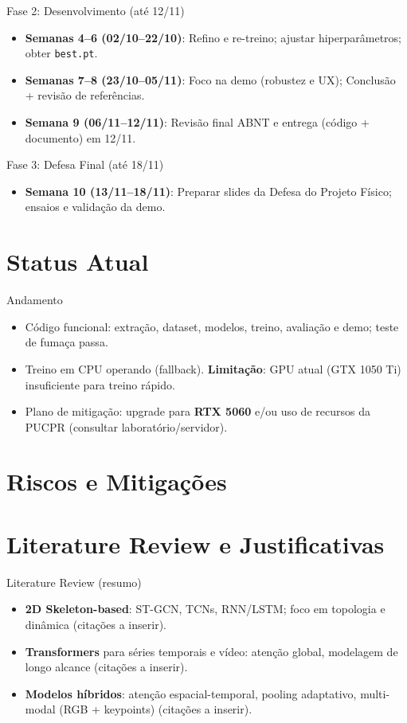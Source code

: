\documentclass[aspectratio=169]{beamer}
\begin{document}
\begin{frame}{Fase 2: Desenvolvimento (até 12/11)}
  \begin{itemize}
    \item \textbf{Semanas 4–6 (02/10–22/10)}: Refino e re-treino; ajustar hiperparâmetros; obter \texttt{best.pt}.
    \item \textbf{Semanas 7–8 (23/10–05/11)}: Foco na demo (robustez e UX); Conclusão + revisão de referências.
    \item \textbf{Semana 9 (06/11–12/11)}: Revisão final ABNT e entrega (código + documento) em 12/11.
  \end{itemize}
\end{frame}

\begin{frame}{Fase 3: Defesa Final (até 18/11)}
  \begin{itemize}
    \item \textbf{Semana 10 (13/11–18/11)}: Preparar slides da Defesa do Projeto Físico; ensaios e validação da demo.
  \end{itemize}
\end{frame}

\section{Status Atual}
\begin{frame}{Andamento}
  \begin{itemize}
    \item Código funcional: extração, dataset, modelos, treino, avaliação e demo; teste de fumaça passa.
    \item Treino em CPU operando (fallback). \textbf{Limitação}: GPU atual (GTX 1050 Ti) insuficiente para treino rápido.
    \item Plano de mitigação: upgrade para \textbf{RTX 5060} e/ou uso de recursos da PUCPR (consultar laboratório/servidor).
  \end{itemize}
\end{frame}

\section{Riscos e Mitigações}
\section{Literature Review e Justificativas}
\begin{frame}{Literature Review (resumo)}
  \begin{itemize}
    \item \textbf{2D Skeleton-based}: ST-GCN, TCNs, RNN/LSTM; foco em topologia e dinâmica (citações a inserir).
    \item \textbf{Transformers} para séries temporais e vídeo: atenção global, modelagem de longo alcance (citações a inserir).
    \item \textbf{Modelos híbridos}: atenção espacial-temporal, pooling adaptativo, multi-modal (RGB + keypoints) (citações a inserir).
  \end{itemize}
\end{frame}
\end{document}
